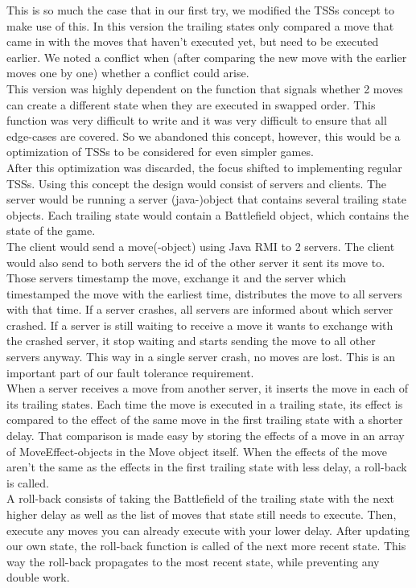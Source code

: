 This is so much the case that in our first try, we modified the TSSs concept to make use of this. In this version the trailing states only compared a move that came in with the moves that haven't executed yet, but need to be executed earlier. We noted a conflict when (after comparing the new move with the earlier moves one by one) whether a conflict could arise.\\
This version was highly dependent on the function that signals whether 2 moves can create a different state when they are executed in swapped order. This function was very difficult to write and it was very difficult to ensure that all edge-cases are covered. So we abandoned this concept, however, this would be a optimization of TSSs to be considered for even simpler games.\\
After this optimization was discarded, the focus shifted to implementing regular TSSs. Using this concept the design would consist of servers and clients. The server would be running a server (java-)object that contains several trailing state objects. Each trailing state would contain a Battlefield object, which contains the state of the game.\\
The client would send a move(-object) using Java RMI to 2 servers. The client would also send to both servers the id of the other server it sent its move to. Those servers timestamp the move, exchange it and the server which timestamped the move with the earliest time, distributes the move to all servers with that time. If a server crashes, all servers are informed about which server crashed. If a server is still waiting to receive a move it wants to exchange with the crashed server, it stop waiting and starts sending the move to all other servers anyway. This way in a single server crash, no moves are lost. This is an important part of our fault tolerance requirement. \\
When a server receives a move from another server, it inserts the move in each of its trailing states. Each time the move is executed in a trailing state, its effect is compared to the effect of the same move in the first trailing state with a shorter delay. That comparison is made easy by storing the effects of a move in an array of MoveEffect-objects in the Move object itself. When the effects of the move aren't the same as the effects in the first trailing state with less delay, a roll-back is called.\\
A roll-back consists of taking the Battlefield of the trailing state with the next higher delay as well as the list of moves that state still needs to execute. Then, execute any moves you can already execute with your lower delay. After updating our own state, the roll-back function is called of the next more recent state. This way the roll-back propagates to the most recent state, while preventing any double work. \\
